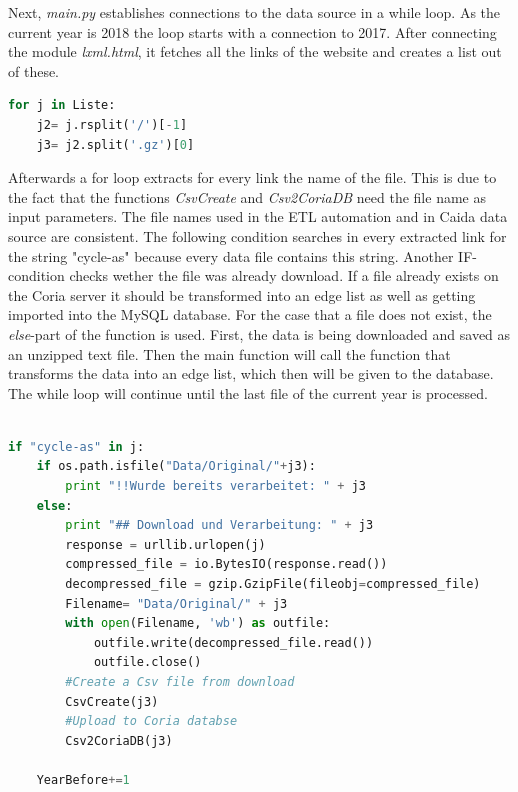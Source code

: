 \documentclass[conference, 11pt]{IEEEtran}
\begin{document}
Next, \textit{main.py} establishes connections to the data source in a while loop. As the current year is 2018 the loop starts with a connection to 2017. After connecting the module \textit{lxml.html}, it fetches all the links of the website and creates a list out of these.

\vspace{0.5cm}
\begin{lstlisting}[language=Python, caption={...},captionpos=b, xleftmargin=.02\textwidth, linewidth = 0.95\columnwidth]
for j in Liste:
	j2= j.rsplit('/')[-1]
	j3= j2.split('.gz')[0]

\end{lstlisting}
\vspace{0.5cm}


Afterwards a for loop extracts for every link the name of the file. This is due to the fact that the functions \textit{CsvCreate} and \textit{Csv2CoriaDB} need the file name as input parameters. The file names used in the ETL automation and in Caida data source are consistent. The following condition searches in every extracted link for the string "cycle-as" because every data file contains this string. Another IF-condition checks wether the file was already download. If a file already exists on the Coria server it should be transformed into an edge list as well as getting imported into the MySQL database. For the case that a file does not exist, the \textit{else}-part of the function is used. First, the data is being downloaded and saved as an unzipped text file. 
Then the main function will call the function that transforms the data into an edge list, which then will be given to the database. The while loop will continue until the last file of the current year is processed.
\linebreak


\begin{lstlisting}[float=*, language=Python,caption={A wide listing float, single column},captionpos=b , xleftmargin=.02\textwidth, linewidth = 0.95\textwidth] 

if "cycle-as" in j:
	if os.path.isfile("Data/Original/"+j3):
		print "!!Wurde bereits verarbeitet: " + j3
	else:
		print "## Download und Verarbeitung: " + j3
		response = urllib.urlopen(j)
		compressed_file = io.BytesIO(response.read())
		decompressed_file = gzip.GzipFile(fileobj=compressed_file)
		Filename= "Data/Original/" + j3
		with open(Filename, 'wb') as outfile:
			outfile.write(decompressed_file.read())
			outfile.close()
		#Create a Csv file from download 
		CsvCreate(j3)
		#Upload to Coria databse 
		Csv2CoriaDB(j3)

	YearBefore+=1 

\end{lstlisting}
\end{document}
